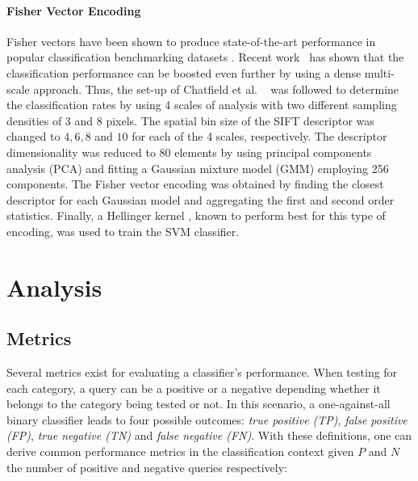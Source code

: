 \paragraph{Fisher Vector Encoding} 
Fisher vectors have been shown to produce state-of-the-art performance in popular classification benchmarking datasets \cite{Chatfield2011}. Recent work~\cite{Perronnin2010} has shown that the classification performance can be boosted even further by using a dense multi-scale approach. Thus, the set-up of Chatfield et al. ~\cite{Chatfield2011} was followed to determine the classification rates by using 4 scales of analysis with two different sampling densities of 3 and 8 pixels. The spatial bin size of the SIFT descriptor was changed to $4,6,8$ and $10$ for each of the 4 scales, respectively. The descriptor dimensionality was reduced to 80 elements by using principal components analysis (PCA) and fitting a Gaussian mixture model (GMM) employing 256 components. The Fisher vector encoding was obtained by finding the closest descriptor for each Gaussian model and aggregating the first and second order statistics. Finally, a Hellinger kernel \cite{Chatfield2011}, known to perform best for this type of encoding, was used to train the SVM classifier.



\section{Analysis} \label{sec:analysis}

\subsection{Metrics}
Several metrics exist for evaluating a classifier's performance. When testing for each category, a query can be a positive or a negative depending whether it belongs to the category being tested or not. In this scenario, a one-against-all binary classifier leads to four possible outcomes: \emph{true positive (TP)}, \emph{false positive (FP)}, \emph{true negative (TN)} and \emph{false negative (FN)}. With these definitions, one can derive common performance metrics in the classification context given $P$ and $N$ the number of positive and negative queries respectively: 

